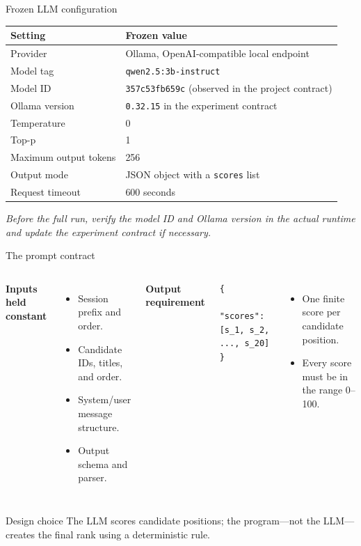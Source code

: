 \documentclass[aspectratio=169,12pt]{beamer}
\newcommand{\source}[1]{\vspace{0.35em}\par{\tiny\color{Muted}\textit{#1}}}
\newcommand{\code}[1]{\texttt{\footnotesize #1}}
\begin{document}
\begin{frame}{Frozen LLM configuration}
\begin{table}
\centering
\small
\begin{tabular}{ll}
\toprule
\textbf{Setting} & \textbf{Frozen value}\\
\midrule
Provider & Ollama, OpenAI-compatible local endpoint\\
Model tag & \code{qwen2.5:3b-instruct}\\
Model ID & \code{357c53fb659c} (observed in the project contract)\\
Ollama version & \code{0.32.15} in the experiment contract\\
Temperature & 0\\
Top-p & 1\\
Maximum output tokens & 256\\
Output mode & JSON object with a \code{scores} list\\
Request timeout & 600 seconds\\
\bottomrule
\end{tabular}
\end{table}

\source{Before the full run, verify the model ID and Ollama version in the actual runtime and update the experiment contract if necessary.}
\end{frame}

\begin{frame}[fragile]{The prompt contract}
\begin{columns}[T]
\textbf{Inputs held constant}
\begin{itemize}
  \item Session prefix and order.
  \item Candidate IDs, titles, and order.
  \item System/user message structure.
  \item Output schema and parser.
\end{itemize}

\textbf{Output requirement}
\begin{lstlisting}
{
  "scores": [s_1, s_2, ..., s_20]
}
\end{lstlisting}
\begin{itemize}
  \item One finite score per candidate position.
  \item Every score must be in the range 0--100.
\end{itemize}
\end{columns}

\begin{block}{Design choice}
The LLM scores candidate positions; the program—not the LLM—creates the final
rank using a deterministic rule.
\end{block}
\end{frame}
\end{document}
